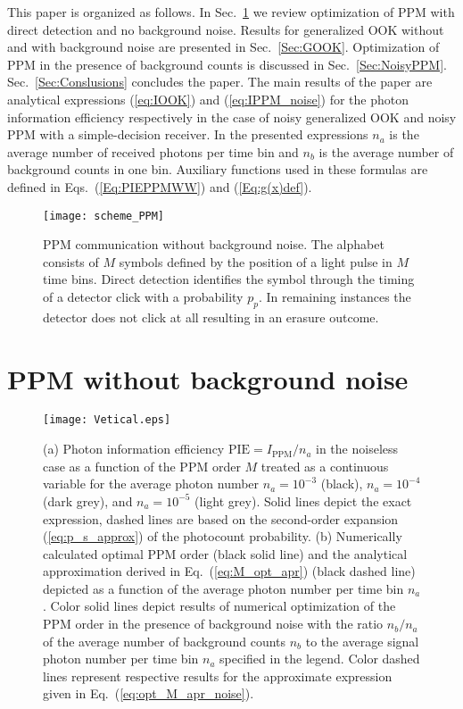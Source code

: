 \documentclass[conference]{IEEEtran}
\begin{document}
This paper is organized as follows. In Sec.~\ref{Sec:PPM} we review optimization of PPM with direct detection and no background noise. Results for generalized OOK without and with background noise are presented in Sec.~\ref{Sec:GOOK}. Optimization of PPM in the presence of background counts is discussed in Sec.~\ref{Sec:NoisyPPM}. Sec.~\ref{Sec:Conslusions} concludes the paper. The main results of the paper are analytical expressions (\ref{eq:IOOK}) and (\ref{eq:IPPM_noise}) for the photon information efficiency respectively in the case of noisy generalized OOK  and  noisy PPM with a simple-decision receiver. In the presented expressions $n_a$ is the average number of received photons per time bin and $n_b$ is the average number of background counts in one bin. Auxiliary functions used in these formulas are defined in Eqs.~(\ref{Eq:PIEPPMWW}) and (\ref{Eq:g(x)def}).

\begin{figure}[t]
\begin{centering}
\texttt{[image: scheme\_PPM]}
\caption{PPM communication without background noise. The alphabet consists of $M$ symbols defined by the position of a light pulse in $M$ time bins. Direct detection identifies the symbol through the timing of a detector click with a probability $p_p$. In remaining instances the detector does not click at all resulting in an erasure outcome.}
\label{fig:scheme_PPM}
\end{centering}
\end{figure}

\section{PPM without background noise}
\label{Sec:PPM}

\begin{figure}[t]
\texttt{[image: Vetical.eps]}
\caption{(a) Photon information efficiency $\textrm{PIE}=I_\textrm{{PPM}}/n_a$ in the noiseless case as a function of the PPM order $M$ treated as a continuous variable for the average photon number $n_a=10^{-3}$ (black), $n_a=10^{-4}$ (dark grey), and $n_a=10^{-5}$ (light grey). Solid lines depict the exact expression, dashed lines are based on the second-order expansion (\ref{eq:p_s_approx}) of the photocount probability. (b) Numerically calculated optimal PPM order (black solid line) and the analytical approximation derived in Eq.~(\ref{eq:M_opt_apr}) (black dashed line) depicted as a function of the average photon number per time bin $n_a$. Color solid lines depict results of numerical optimization of the PPM order in the presence of background noise with the ratio $n_b/n_a$ of the average number of background counts $n_b$ to the average signal photon number per time bin $n_a$ specified in the legend. Color dashed lines represent respective results for the approximate expression given in Eq.~(\ref{eq:opt_M_apr_noise}).}
\label{fig:M_dependence}
\end{figure}
\end{document}

